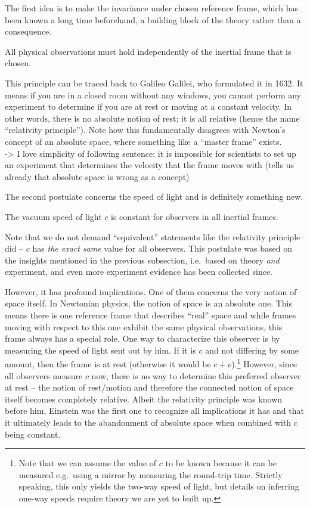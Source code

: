 \documentclass[../relativity_main.tex]{subfiles}
\begin{document}
The first idea is to make the invariance under chosen reference frame, which has been known a long time beforehand, a building block of the theory rather than a consequence.
\begin{post}
	All physical observations must hold independently of the inertial frame that is chosen.
\end{post}
This principle can be traced back to Galileo Galilei, who formulated it in 1632. It means if you are in a closed room without any windows, you cannot perform any experiment to determine if you are at rest or moving at a constant velocity. In other words, there is no absolute notion of rest; it is all relative (hence the name \enquote{relativity principle}). Note how this fundamentally disagrees with Newton's concept of an absolute space, where something like a \enquote{master frame} exists.\\


-> I love simplicity of following sentence: it is impossible for scientists to set up an experiment that determines the velocity that the frame moves with (tells us already that absolute space is wrong as a concept)


The second postulate concerns the speed of light and is definitely something new.
\begin{post}\label{post:c_constant}
	The vacuum speed of light $c$ is constant for observers in all inertial frames.
\end{post}
Note that we do not demand \enquote{equivalent} statements like the relativity principle did -- $c$ has \emph{the exact same} value for all observers. This postulate was based on the insights mentioned in the previous subsection, i.e.~based on theory \emph{and} experiment, and even more experiment evidence has been collected since.

However, it has profound implications. One of them concerns the very notion of space itself. In Newtonian physics, the notion of space is an absolute one. This means there is one reference frame that describes \enquote{real} space and while frames moving with respect to this one exhibit the same physical observations, this frame always has a special role. One way to characterize this observer is by measuring the speed of light sent out by him. If it is $c$ and not differing by some amount, then the frame is at rest (otherwise it would be $c + v$).\footnote{Note that we can assume the value of $c$ to be known because it can be measured e.g.~using a mirror by measuring the round-trip time. Strictly speaking, this only yields the two-way speed of light, but details on inferring one-way speeds require theory we are yet to built up.} However, since all observers measure $c$ now, there is no way to determine this preferred observer at rest -- the notion of rest/motion and therefore the connected notion of space itself becomes completely relative. Albeit the relativity principle was known before him, Einstein was the first one to recognize all implications it has and that it ultimately leads to the abandonment of absolute space when combined with $c$ being constant.
\end{document}

